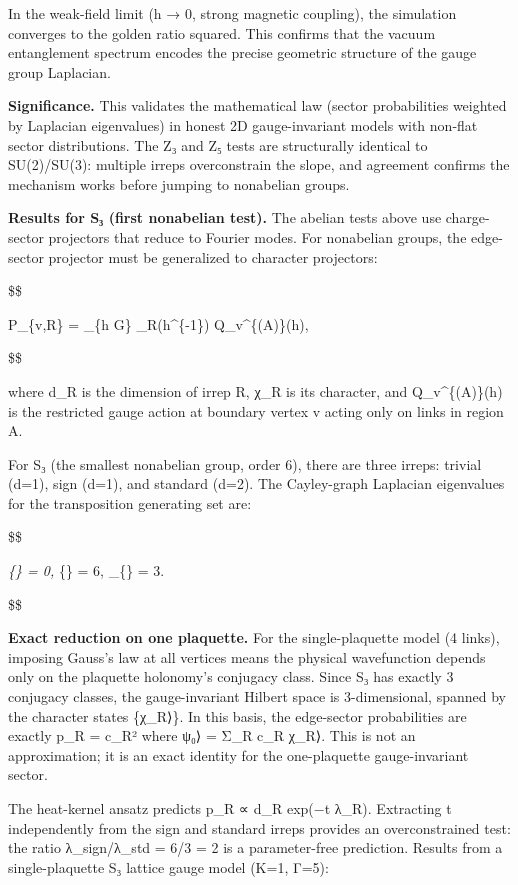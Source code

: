 \documentclass[11pt,a4paper]{article}
\theoremstyle{remark}
\begin{document}
In the weak-field limit (h → 0, strong magnetic coupling), the simulation
converges to the golden ratio squared. This confirms that the vacuum
entanglement spectrum encodes the precise geometric structure of the gauge
group Laplacian.

\textbf{Significance.} This validates the mathematical law (sector probabilities
weighted by Laplacian eigenvalues) in honest 2D gauge-invariant models with
non-flat sector distributions. The Z₃ and Z₅ tests are
structurally identical to SU(2)/SU(3): multiple irreps overconstrain the slope,
and agreement confirms the mechanism works before jumping to nonabelian groups.

\textbf{Results for S₃ (first nonabelian test).} The abelian tests above use
charge-sector projectors that reduce to Fourier modes. For nonabelian groups,
the edge-sector projector must be generalized to character projectors:

\$\$

P\_\{v,R\} =  \sum\_\{h \in G\} \chi\_R(h\^{}\{-1\}) Q\_v\^{}\{(A)\}(h),

\$\$

where d\_R is the dimension of irrep R, χ\_R is its character, and
Q\_v\^{}\{(A)\}(h) is the restricted gauge action at boundary vertex v acting
only on links in region A.

For S₃ (the smallest nonabelian group, order 6), there are three irreps:
trivial (d=1), sign (d=1), and standard (d=2). The Cayley-graph Laplacian
eigenvalues for the transposition generating set are:

\$\$

\lambda\emph{\{\} = 0, \qquad \lambda}\{\} = 6, \qquad
\lambda\_\{\} = 3.

\$\$

\textbf{Exact reduction on one plaquette.} For the single-plaquette model (4 links),
imposing Gauss's law at all vertices means the physical wavefunction depends
only on the plaquette holonomy's conjugacy class. Since S₃ has exactly 3
conjugacy classes, the gauge-invariant Hilbert space is 3-dimensional, spanned
by the character states \{\textbar χ\_R⟩\}. In this basis, the edge-sector
probabilities are exactly p\_R = \textbar c\_R\textbar² where \textbar ψ₀⟩ = Σ\_R c\_R
\textbar χ\_R⟩. This is not an approximation; it is an exact identity for the
one-plaquette gauge-invariant sector.

The heat-kernel ansatz predicts p\_R ∝ d\_R exp(−t λ\_R). Extracting
t independently from the sign and standard irreps provides an overconstrained
test: the ratio λ\_sign/λ\_std = 6/3 = 2 is a
parameter-free prediction. Results from a single-plaquette S₃ lattice gauge
model (K=1, Γ=5):
\end{document}
